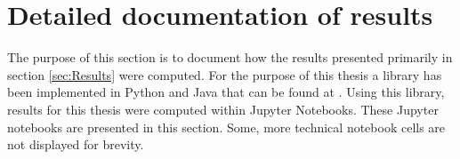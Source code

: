 \documentclass[../Thesis_AHoecherl.tex]{subfiles}
\begin{document}
    \chapter{Detailed documentation of results}\label{Detailed documentation of results}
    The purpose of this section is to document how the results presented primarily in section \ref{sec:Results} were computed.
    For the purpose of this thesis a library has been implemented in Python and Java that can be found at \cite{Hoecherl2020}.
    Using this library, results for this thesis were computed within Jupyter Notebooks. These Jupyter notebooks are presented in this section. 
    Some, more technical notebook cells are not displayed for brevity.  

    

    

    

    

    
    
    

    

    

    
\end{document}
